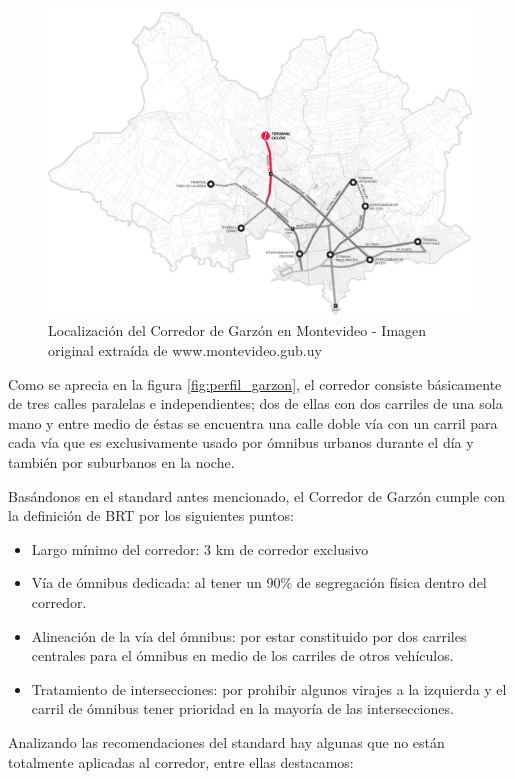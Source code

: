 \begin{figure}[H]
	\centering
	\includegraphics[width=0.7\linewidth]{Figures/Mapa_Garzon_0}
	\caption{Localización del Corredor de Garzón en Montevideo - Imagen original extraída de www.montevideo.gub.uy		
	}
	\label{fig:Grafica de costos de otros medios de transporte}
\end{figure}

Como se aprecia en la figura \ref{fig:perfil_garzon}, el corredor consiste básicamente de tres calles paralelas e independientes; dos de ellas con dos carriles de una sola mano y entre medio de éstas se encuentra una calle doble vía con un carril para cada vía que es exclusivamente usado por ómnibus urbanos durante el día y también por suburbanos en la noche.


Basándonos en el standard antes mencionado, el Corredor de Garzón cumple con la definición de BRT por los siguientes puntos:
\begin{itemize}
	\item Largo mínimo del corredor: 3 km de corredor exclusivo 
	\item Vía de ómnibus dedicada: al tener un 90\% de segregación física dentro del corredor.
	\item Alineación de la vía del ómnibus: por estar constituido por dos carriles centrales para el ómnibus en medio de los carriles de otros vehículos.
	\item Tratamiento de intersecciones: por prohibir algunos virajes a la izquierda y el carril de ómnibus tener prioridad en la mayoría de las intersecciones.
\end{itemize}


Analizando las recomendaciones del standard hay algunas que no están totalmente aplicadas al corredor, entre ellas destacamos:

